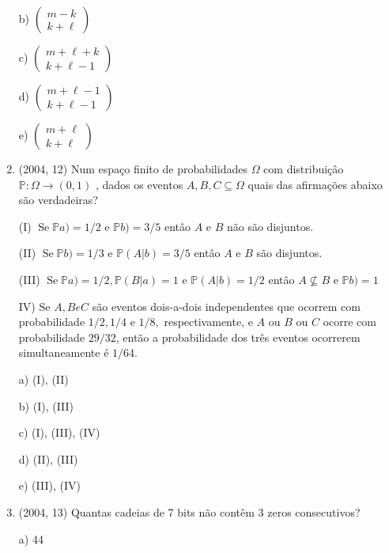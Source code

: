 \documentclass{article}
\begin{document}
\begin{enumerate}
b) $\left(\begin{array}{c}{m-k} \\ {k+\ell}\end{array}\right)$

c) $\left(\begin{array}{l}{m+\ell+k} \\ {k+\ell-1}\end{array}\right)$

d) $\left(\begin{array}{c}{m+\ell-1} \\ {k+\ell-1}\end{array}\right)$

e) $\left(\begin{array}{l}{m+\ell} \\ {k+\ell}\end{array}\right)$ \newline

     


\item(2004, 12) Num espaço finito de probabilidades $\Omega$ com distribuiçâo $\mathbb{P} : \Omega \rightarrow(0,1)$ , dados os eventos $A, B, C \subseteq \Omega$ quais das afirmações abaixo são verdadeiras?

(I) $\operatorname{Se} \mathbb{P}a)=1 / 2$ e $\mathbb{P}b)=3 / 5$ entâo $A$ e $B$ não são disjuntos.

(II) $\operatorname{Se} \mathbb{P}b)=1 / 3$ e $\mathbb{P}(A | b)=3 / 5$ entâo $A$ e $B$ são disjuntos. 

(III) $\operatorname{Se} \mathbb{P}a)=1 / 2, \mathbb{P}(B | a)=1$ e $\mathbb{P}(A | b)=1 / 2$ entâo $A \not\subseteq B$ e $\mathbb{P}b)=1$

IV) Se $A, B e C$ são eventos dois-a-dois independentes que ocorrem com probabilidade $1 / 2,1 / 4$ e $1 / 8,$ respectivamente, e $A$ ou $B$ ou $C$ ocorre com probabilidade $29/32$, então a probabilidade dos três eventos ocorrerem simultaneamente é $1/64$.


a) (I), (II)

b) (I), (III)

c) (I), (III), (IV)

d) (II), (III)

e) (III), (IV)\newline



\item(2004, 13) Quantas cadeias de 7 bits não contêm 3 zeros consecutivos?

a) 44


\end{enumerate}
\end{document}
